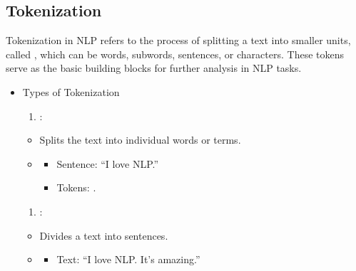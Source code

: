 \documentclass[letterpaper,11pt,english]{sphinxmanual}
\begin{document}
\subsection{Tokenization}
\label{\detokenize{prelim:tokenization}}
\sphinxAtStartPar
Tokenization in NLP refers to the process of splitting a text into smaller units, called , which
can be words, subwords, sentences, or characters. These tokens serve as the basic building blocks for further
analysis in NLP tasks.
\begin{itemize}
\item {} 
\sphinxAtStartPar
Types of Tokenization
\begin{enumerate}
%
\item {} 
\sphinxAtStartPar
{}:

\end{enumerate}
\begin{itemize}
\item {} 
\sphinxAtStartPar
Splits the text into individual words or terms.

\item {} \begin{description}
\begin{itemize}
\item {} 
\sphinxAtStartPar
Sentence: “I love NLP.”

\item {} 
\sphinxAtStartPar
Tokens: .

\end{itemize}

\end{description}

\end{itemize}
\begin{enumerate}
%
\setcounter{enumi}{1}
\item {} 
\sphinxAtStartPar
{}:

\end{enumerate}
\begin{itemize}
\item {} 
\sphinxAtStartPar
Divides a text into sentences.

\item {} \begin{description}
\begin{itemize}
\item {} 
\sphinxAtStartPar
Text: “I love NLP. It’s amazing.”


\end{itemize}
\end{description}
\end{itemize}
\end{itemize}
\end{document}
